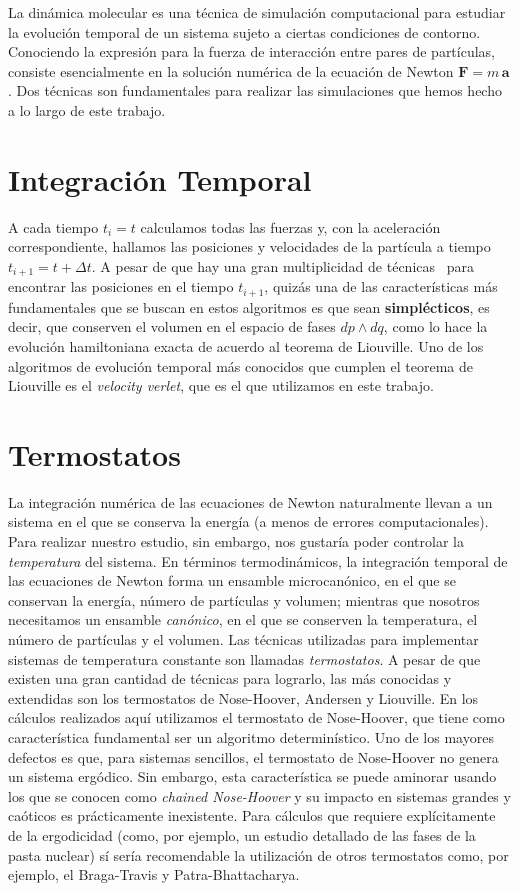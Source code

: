 La dinámica molecular es una técnica de simulación computacional para estudiar la evolución temporal de un sistema sujeto a ciertas condiciones de contorno.
Conociendo la expresión para la fuerza de interacción entre pares de partículas, consiste esencialmente en la solución numérica de la ecuación de Newton $\mathbf{F}=m\,\mathbf{a}$.
Dos técnicas son fundamentales para realizar las simulaciones que hemos hecho a lo largo de este trabajo.

\section{Integración Temporal}
A cada tiempo $t_i = t$ calculamos todas las fuerzas y, con la aceleración correspondiente, hallamos las posiciones y velocidades de la partícula a tiempo $t_{i+1} = t + \Delta t$.
A pesar de que hay una gran multiplicidad de técnicas~\cite{hairer_geometric_2002} para encontrar las posiciones en el tiempo $t_{i+1}$, quizás una de las características más fundamentales que se buscan en estos algoritmos es que sean \textbf{simplécticos}, es decir, que conserven el volumen en el espacio de fases $dp \wedge dq$, como lo hace la evolución hamiltoniana exacta de acuerdo al teorema de Liouville.
Uno de los algoritmos de evolución temporal más conocidos que cumplen el teorema de Liouville es el \emph{velocity verlet}, que es el que utilizamos en este trabajo.

\section{Termostatos}
La integración numérica de las ecuaciones de Newton naturalmente llevan a un sistema en el que se conserva la energía (a menos de errores computacionales).
Para realizar nuestro estudio, sin embargo, nos gustaría poder controlar la \emph{temperatura} del sistema.
En términos termodinámicos, la integración temporal de las ecuaciones de Newton forma un ensamble microcanónico, en el que se conservan la energía, número de partículas y volumen; mientras que nosotros necesitamos un ensamble \emph{canónico}, en el que se conserven la temperatura, el número de partículas y el volumen.
Las técnicas utilizadas para implementar sistemas de temperatura constante son llamadas \emph{termostatos}.
A pesar de que existen una gran cantidad de técnicas para lograrlo, las más conocidas y extendidas son los termostatos de Nose-Hoover, Andersen y Liouville.
En los cálculos realizados aquí utilizamos el termostato de Nose-Hoover, que tiene como característica fundamental ser un algoritmo determinístico.
Uno de los mayores defectos es que, para sistemas sencillos, el termostato de Nose-Hoover no genera un sistema ergódico.
Sin embargo, esta característica se puede aminorar usando los que se conocen como \emph{chained Nose-Hoover} y su impacto en sistemas grandes y caóticos es prácticamente inexistente.
Para cálculos que requiere explícitamente de la ergodicidad (como, por ejemplo, un estudio detallado de las fases de la pasta nuclear) sí sería recomendable la utilización de otros termostatos como, por ejemplo, el Braga-Travis y Patra-Bhattacharya.